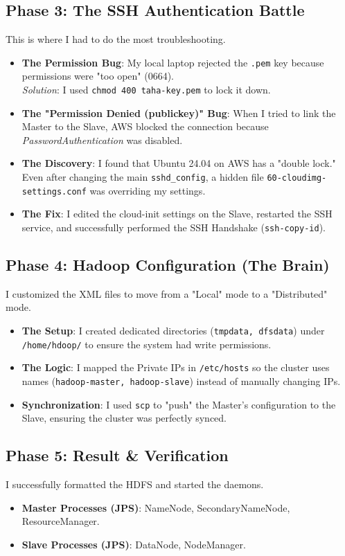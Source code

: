 \documentclass{article}
\begin{document}
\subsection*{Phase 3: The SSH Authentication Battle}
This is where I had to do the most troubleshooting.
\begin{itemize}
    \item \textbf{The Permission Bug}: My local laptop rejected the \texttt{.pem} key because permissions were "too open" (0664). \\
    \textit{Solution}: I used \texttt{chmod 400 taha-key.pem} to lock it down.
    \item \textbf{The "Permission Denied (publickey)" Bug}: When I tried to link the Master to the Slave, AWS blocked the connection because \textit{PasswordAuthentication} was disabled. 
    \item \textbf{The Discovery}: I found that Ubuntu 24.04 on AWS has a "double lock." Even after changing the main \texttt{sshd\_config}, a hidden file \texttt{60-cloudimg-settings.conf} was overriding my settings.
    \item \textbf{The Fix}: I edited the cloud-init settings on the Slave, restarted the SSH service, and successfully performed the SSH Handshake (\texttt{ssh-copy-id}).
\end{itemize}

\subsection*{Phase 4: Hadoop Configuration (The Brain)}
I customized the XML files to move from a "Local" mode to a "Distributed" mode.
\begin{itemize}
    \item \textbf{The Setup}: I created dedicated directories (\texttt{tmpdata, dfsdata}) under \texttt{/home/hdoop/} to ensure the system had write permissions.
    \item \textbf{The Logic}: I mapped the Private IPs in \texttt{/etc/hosts} so the cluster uses names (\texttt{hadoop-master, hadoop-slave}) instead of manually changing IPs.
    \item \textbf{Synchronization}: I used \texttt{scp} to "push" the Master’s configuration to the Slave, ensuring the cluster was perfectly synced.
\end{itemize}

\subsection*{Phase 5: Result \& Verification}
I successfully formatted the HDFS and started the daemons.
\begin{itemize}
    \item \textbf{Master Processes (JPS)}: NameNode, SecondaryNameNode, ResourceManager.
    \item \textbf{Slave Processes (JPS)}: DataNode, NodeManager.
\end{itemize}
\end{document}
